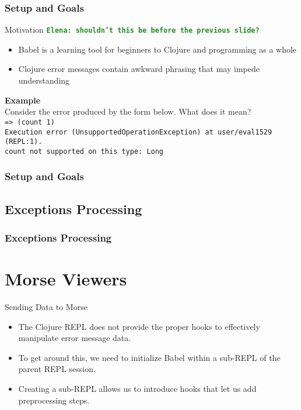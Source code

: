 \documentclass{beamer}
\newcommand{\comment}[1]{{\bf \tt  {#1}}}
\newcommand{\emcomment}[1]{\textcolor{ForestGreen}{\comment{Elena: {#1}}}}
\begin{document}
\begin{frame}
    \frametitle{Setup and Goals}
    Motivation
\emcomment{shouldn't this be before the previous slide?}
    \begin{itemize}
        \item Babel is a learning tool for beginners to Clojure and programming as a whole
        \item Clojure error messages contain awkward phrasing that may impede understanding
    \end{itemize}
    \textbf{Example} \\
    Consider the error produced by the form below. What does it mean? \\
    \texttt{=> (count 1)} \\
    \texttt{Execution error (UnsupportedOperationException) at user/eval1529 (REPL:1).} \\
    \texttt{count not supported on this type: Long} \\
\end{frame}
    
\begin{frame}
\frametitle{Setup and Goals}

\end{frame}

\subsection{Exceptions Processing}

\begin{frame}
\frametitle{Exceptions Processing}

\end{frame}

\section{Morse Viewers}

\begin{frame}{Sending Data to Morse}
  \begin{itemize}
    \item<1-> The Clojure REPL does not provide the proper hooks to effectively manipulate error message data.
    \item<2-> To get around this, we need to initialize Babel within a sub-REPL of the parent REPL session.
    \item<3-> Creating a sub-REPL allows us to introduce hooks that let us add preprocessing steps.
  \end{itemize}
\end{frame}
\end{document}
